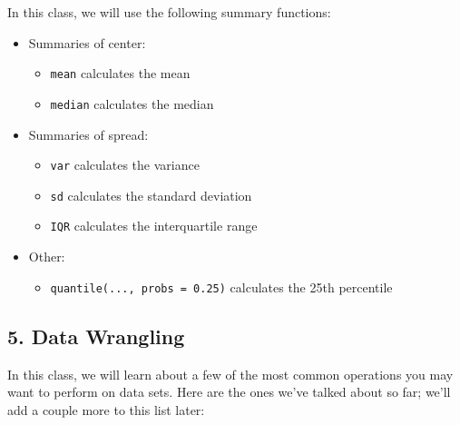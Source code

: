 \documentclass[]{article}
\providecommand{\tightlist}{%
  \setlength{\itemsep}{0pt}\setlength{\parskip}{0pt}}
\begin{document}
In this class, we will use the following summary functions:

\begin{itemize}
\tightlist
\item
  Summaries of center:

  \begin{itemize}
  \tightlist
  \item
    \texttt{mean} calculates the mean
  \item
    \texttt{median} calculates the median
  \end{itemize}
\item
  Summaries of spread:

  \begin{itemize}
  \tightlist
  \item
    \texttt{var} calculates the variance
  \item
    \texttt{sd} calculates the standard deviation
  \item
    \texttt{IQR} calculates the interquartile range
  \end{itemize}
\item
  Other:

  \begin{itemize}
  \tightlist
  \item
    \texttt{quantile(...,\ probs\ =\ 0.25)} calculates the 25th
    percentile
  \end{itemize}
\end{itemize}

\subsection{5. Data Wrangling}\label{data-wrangling}

In this class, we will learn about a few of the most common operations
you may want to perform on data sets. Here are the ones we've talked
about so far; we'll add a couple more to this list later:
\end{document}
